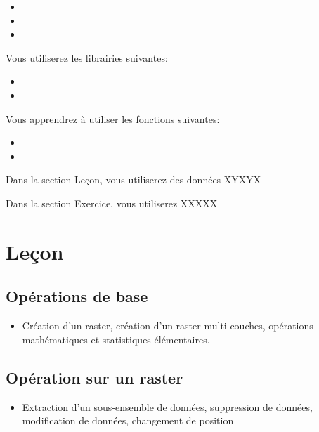 \documentclass[
  12pt,
]{krantz}
\providecommand{\tightlist}{%
  \setlength{\itemsep}{0pt}\setlength{\parskip}{0pt}}
\begin{document}
\begin{itemize}
\item
\item
\item
\end{itemize}

Vous utiliserez les librairies suivantes:

\begin{itemize}
\item
\item
\end{itemize}

Vous apprendrez à utiliser les fonctions suivantes:

\begin{itemize}
\item
\item
\end{itemize}

Dans la section Leçon, vous utiliserez des données XYXYX

Dans la section Exercice, vous utiliserez XXXXX

\hypertarget{leuxe7on-6}{%
\section{Leçon}\label{leuxe7on-6}}

\hypertarget{opuxe9rations-de-base-1}{%
\subsection{Opérations de base}\label{opuxe9rations-de-base-1}}

\begin{itemize}
\tightlist
\item
  Création d'un raster, création d'un raster multi-couches, opérations mathématiques et statistiques élémentaires.
\end{itemize}

\hypertarget{opuxe9ration-sur-un-raster}{%
\subsection{Opération sur un raster}\label{opuxe9ration-sur-un-raster}}

\begin{itemize}
\tightlist
\item
  Extraction d'un sous-ensemble de données, suppression de données, modification de données, changement de position
\end{itemize}
\end{document}
